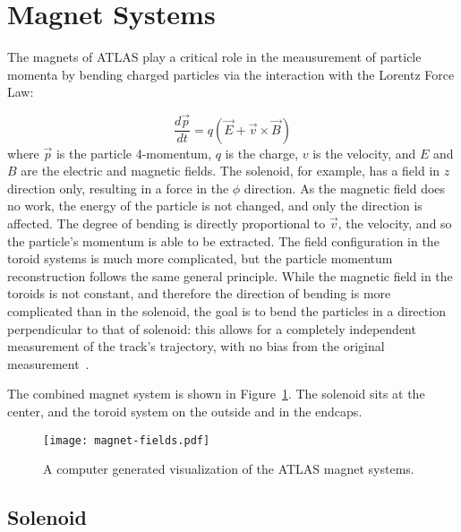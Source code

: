

\section{Magnet Systems}

The magnets of ATLAS play a critical role in the meausurement of particle momenta by bending charged particles via the interaction with the Lorentz Force Law:

\begin{equation}
\frac{d \vec{p}}{d t} = q (\vec{E} + \vec{v} \times \vec{B})
\end{equation}
%
where $\vec{p}$ is the particle 4-momentum, $q$ is the charge, $v$ is the velocity, and $E$ and $B$ are the electric and magnetic fields. The solenoid, for example, has a field in $z$ direction only, resulting in a force in the $\phi$ direction. As the magnetic field does no work, the energy of the particle is not changed, and only the direction is affected. The degree of bending is directly proportional to $\vec{v}$, the velocity, and so the particle's momentum is able to be extracted. The field configuration in the toroid systems is much more complicated, but the particle momentum reconstruction follows the same general principle. While the magnetic field in the toroids is not constant, and therefore the direction of bending is more complicated than in the solenoid, the goal is to bend the particles in a direction perpendicular to that of solenoid: this allows for a completely independent measurement of the track's trajectory, with no bias from the original measurement~\cite{ATLASMS}.

The combined magnet system is shown in Figure~\ref{fig:detector:magnets}. The solenoid sits at the center, and the toroid system on the outside and in the endcaps.


\begin{figure}
\centering
\texttt{[image: magnet-fields.pdf]}
\label{fig:detector:magnets}
\caption{A computer generated visualization of the ATLAS magnet systems.}
\end{figure}



\subsection{Solenoid}
\label{atlas:magnets:solenoid}

